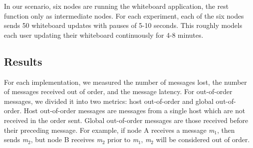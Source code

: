 \documentclass{llncs}
\begin{document}
In our scenario, six nodes are running the whiteboard application, the rest function only as intermediate nodes. For each experiment, each of the six nodes sends 50 whiteboard updates with pauses of 5-10 seconds. This roughly models each user updating their whiteboard continuously for 4-8 minutes.

\subsection{Results}

For each implementation, we measured the number of messages lost, the number of messages received out of order, and the message latency. For out-of-order messages, we divided it into two metrics: host out-of-order and global out-of-order. Host out-of-order messages are messages from a single host which are not received in the order sent. Global out-of-order messages are those received before their preceding message. For example, if node A receives a message \textit{m}$_{1}$, then sends \textit{m}$_{2}$, but node B receives \textit{m}$_{2}$ prior to \textit{m}$_{1}$, \textit{m}$_{2}$ will be considered out of order.
\end{document}
